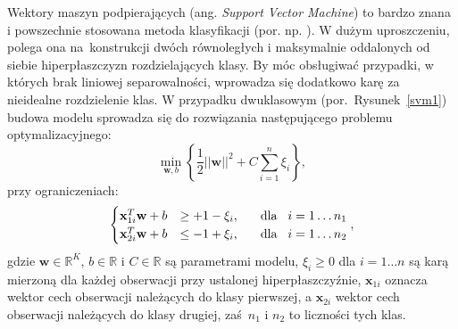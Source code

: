 \documentclass{mini}
\begin{document}
Wektory maszyn podpierających (ang. \textit{Support Vector Machine}) to bardzo znana i powszechnie stosowana metoda klasyfikacji (por. np. \cite{koronacki}). W dużym uproszczeniu, polega ona na~konstrukcji dwóch równoległych i maksymalnie oddalonych od siebie hiperpłaszczyzn rozdzielających klasy. By móc obsługiwać przypadki, w których brak liniowej separowalności, wprowadza się dodatkowo karę za nieidealne rozdzielenie klas. W przypadku dwuklasowym (por.~Rysunek~\ref{svm1}) budowa modelu sprowadza się do rozwiązania następującego problemu optymalizacyjnego:
$$
\min_{\mathbf{w}, b}\left\lbrace\dfrac{1}{2}||\textbf{w}||^2+C\sum_{i=1}^{n}\xi_i\right\rbrace,
$$
przy ograniczeniach:
$$
\begin{cases}
\mathbf{x}^T_{1i}\textbf{w}+b &\geq +1-\xi_i, \hspace{6mm} \text{dla}\hspace{3mm}i=1\ldots n_1 \\
\mathbf{x}^T_{2i}\textbf{w}+b &\leq -1+\xi_i, \hspace{6mm} \text{dla}\hspace{3mm}i=1\ldots n_2
\end{cases},
$$    
gdzie $\mathbf{w}\in\mathbb{R}^K$, $b\in\mathbb{R}$ i $C\in\mathbb{R}$ są parametrami modelu, $\xi_i\geq 0$ dla $i=1\ldots n$ są karą mierzoną dla każdej obserwacji przy ustalonej hiperpłaszczyźnie, $\mathbf{x}_{1i}$ oznacza wektor cech obserwacji należących do klasy pierwszej, a $\mathbf{x}_{2i}$ wektor cech obserwacji należących do klasy drugiej, zaś~$n_1$ i $n_2$ to liczności tych klas. 
\end{document}
